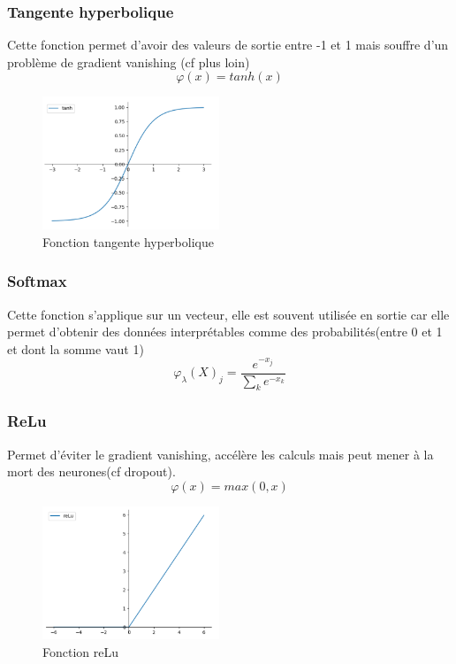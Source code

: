 \subsubsection{Tangente hyperbolique}
Cette fonction permet d'avoir des valeurs de sortie entre -1 et 1 mais souffre d'un problème de gradient vanishing (cf plus loin)
\begin{displaymath}
\varphi (x) = tanh(x)
\end{displaymath}

\begin{figure}[!h]
\centering
\includegraphics[width=150pt]{"images/MLP/tanh2"}
\caption{Fonction tangente hyperbolique\\ }
\label{tanh}
\end{figure}


\subsubsection{Softmax}
Cette fonction s'applique sur un vecteur, elle est souvent utilisée en sortie car elle permet d'obtenir des données interprétables comme des probabilités(entre 0 et 1 et dont la somme vaut 1)
\begin{displaymath}
\varphi_\lambda (X)_j = \frac{e^{-x_j}}{\sum\limits_{k}  e^{-x_k}}
\end{displaymath}

\subsubsection{ReLu}
Permet d'éviter le gradient vanishing, accélère les calculs mais peut mener à la mort des neurones(cf dropout).
\begin{displaymath}
\varphi (x) = max(0,x)
\end{displaymath}

\begin{figure}[!h]
\centering
\includegraphics[width=150pt]{"images/MLP/ReLu2"}
\caption{Fonction reLu}
\label{ReLu}
\end{figure}

